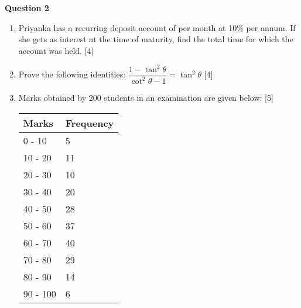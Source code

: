 \par
\noindent
\textbf{Question 2}\\
\begin{enumerate}[label=(\roman*)]

    \item Priyanka has a recurring deposit account of  per month
        at 10\% per annum. If she gets  as interest at the time 
        of maturity, find the total time for which the account was held. \hfill [4]

    \item Prove the following identities: 
        $ \dfrac{1 - \tan^2 \theta}{\cot^2 \theta - 1} = \tan^2 \theta $ \hfill [4]

    \item Marks obtained by 200 students in an examination are given below: \hfill [5]

        \begin{table}[h]
        \centering
        \renewcommand{\arraystretch}{1.3}
        \begin{tabularx}{0.5\textwidth}{| p{2.75 cm} | X | }
            \hline
            \rowcolor{lightgray!30} Marks & Frequency \\
            \hline
            0 - 10 & 5 \\
            \hline
            10 - 20 & 11 \\
            \hline
            20 - 30 & 10 \\
            \hline
            30 - 40 & 20 \\
            \hline
            40 - 50 & 28 \\
            \hline
            50 - 60 & 37 \\
            \hline
            60 - 70 & 40 \\
            \hline
            70 - 80 & 29 \\
            \hline
            80 - 90 & 14 \\
            \hline
            90 - 100 & 6 \\
            \hline
        \end{tabularx}
        \end{table}


\end{enumerate}

